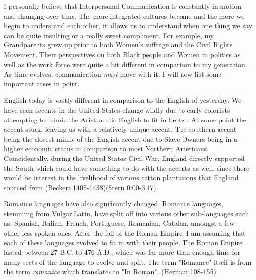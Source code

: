 \documentclass[12pt]{article}
\begin{document}
\par
I personally believe that Interpersonal Communication is constantly in motion and changing over time. The more integrated cultures become and the more we begin to understand each other, it allows us to understand when one thing we say can be quite insulting or a really sweet compliment. For example, my Grandparents grew up prior to both Women's suffrage and the Civil Rights Movement. Their perspectives on  both Black people and Women in politics as well as the work force were quite a bit different in comparison to my generation. As time evolves, communication \emph{must} move with it. I will now list some important cases in point.
\par
English today is vastly different in comparison to the English of yesterday. We have seen accents in the United States change wildly due to early colonists attempting to mimic the Aristrocatic English to fit in better. At some point the accent stuck, leaving us with a relatively unique accent. The southern accent being the closest mimic of the English accent due to Slave Owners being in a higher economic status in comparison to most Northern Americans. Coincidentally, during the United States Civil War, England directly supported the South which could have something to do with the accents as well, since there would be interest in the livelihood of various cotton plantations that England sourced from (Beckert 1405-1438)(Stern 0:00-3:47). 
\par
Romance languages have also significantly changed. Romance languages, stemming from Vulgar Latin, have split off into various other sub-languages such as: Spanish, Italian, French, Portuguese, Romanian, Catalan, amongst a few other less spoken ones. After the fall of the Roman Empire, I am assuming that each of these languages evolved to fit in with their people. The Roman Empire lasted between 27 B.C. to 476 A.D., which was far more than enough time for many sects of the language to evolve and split. The term "Romance" itself is from the term \textit{romanice} which translates to "In Roman". (Herman 108-155) 
\end{document}
